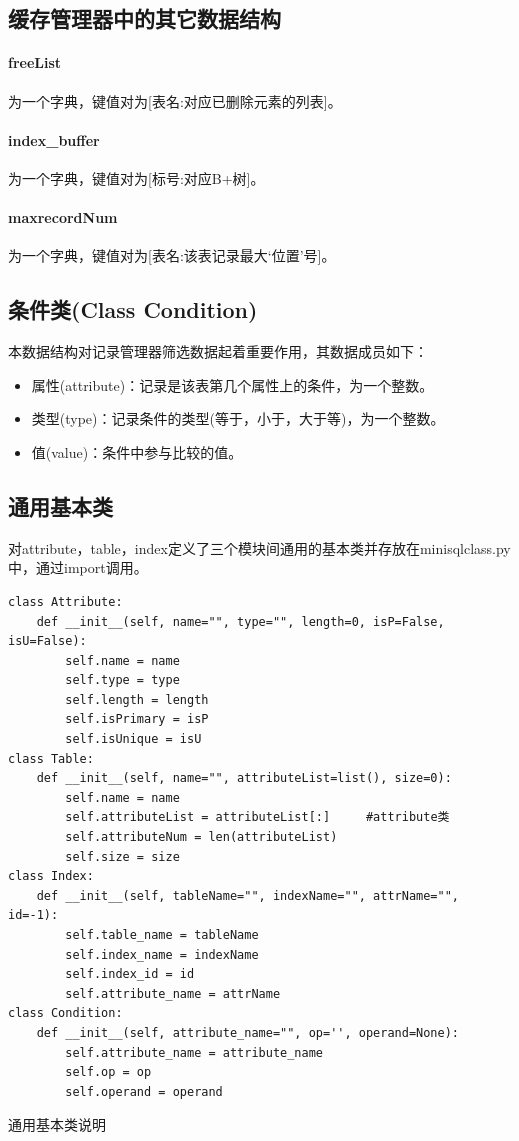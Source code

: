 \documentclass[UTF8]{ctexrep} %
\newenvironment{longlisting}{\captionsetup{type=listing}}{}
\begin{document}
\subsection{缓存管理器中的其它数据结构}
\paragraph{freeList} 为一个字典，键值对为[表名:对应已删除元素的列表]。
\paragraph{index\_buffer} 为一个字典，键值对为[标号:对应B+树]。
\paragraph{maxrecordNum} 为一个字典，键值对为[表名:该表记录最大‘位置’号]。

\subsection{条件类(Class Condition)}
本数据结构对记录管理器筛选数据起着重要作用，其数据成员如下：
\begin{itemize}
	\item 属性(attribute)：记录是该表第几个属性上的条件，为一个整数。
	\item 类型(type)：记录条件的类型(等于，小于，大于等)，为一个整数。
	\item 值(value)：条件中参与比较的值。
\end{itemize}

\subsection{通用基本类}
对attribute，table，index定义了三个模块间通用的基本类并存放在minisqlclass.py中，通过import调用。
\begin{longlisting}
    \begin{verbatim}
class Attribute:
    def __init__(self, name="", type="", length=0, isP=False, isU=False):
        self.name = name
        self.type = type
        self.length = length
        self.isPrimary = isP
        self.isUnique = isU
class Table:
    def __init__(self, name="", attributeList=list(), size=0):
        self.name = name
        self.attributeList = attributeList[:]     #attribute类
        self.attributeNum = len(attributeList)
        self.size = size
class Index:
    def __init__(self, tableName="", indexName="", attrName="", id=-1):
        self.table_name = tableName
        self.index_name = indexName
        self.index_id = id
        self.attribute_name = attrName
class Condition:
    def __init__(self, attribute_name="", op='', operand=None):
        self.attribute_name = attribute_name
        self.op = op
        self.operand = operand
    \end{verbatim}
    \caption{通用基本类说明}
    \label{lst:interface_specification}
\end{longlisting}
\end{document}
